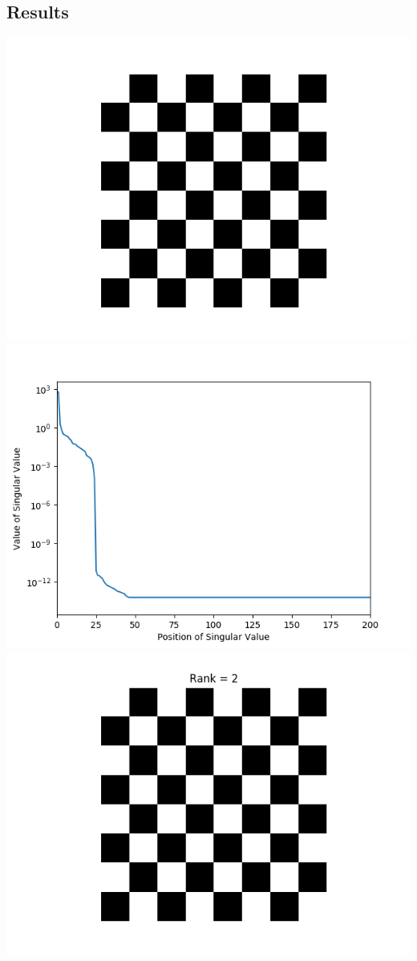 \documentclass[11pt]{article}
\begin{document}
\begin{enumerate}
\section{Results}
\includegraphics[scale=.55]{chess_g.png}
\includegraphics[scale=.55]{checker_sv.png}\\
\includegraphics[scale=.55]{checker_compress.png}

\end{enumerate}
\end{document}
